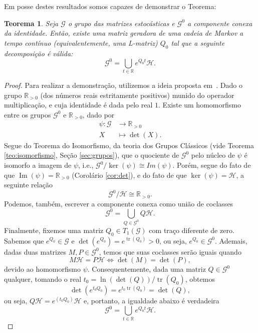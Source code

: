 \documentclass[twoside,openright,titlepage,numbers=noenddot,headinclude,  lineheaders footinclude=true,cleardoublepage=empty,
                                BCOR=5mm,paper=a4,fontsize=12pt ]{scrbook}
\DeclareMathOperator\tr{tr}
\newtheorem{teo}{Teorema}[chapter]
\theoremstyle{definition}
\DeclareMathOperator{\im}{Im}
\begin{document}
%
Em posse destes resultados somos capazes de demonstrar o Teorema:
\begin{teo}
Seja $\mathcal{G}$ o  grupo das matrizes estocásticas e $\mathcal{G}^0$ a componente conexa da identidade.
Então, existe uma matriz geradora de uma cadeia de Markov a tempo contínuo (equivalentemente, uma L-matriz)
 $Q_0$ tal que a seguinte decomposição é válida:
\[
\mathcal{G}^0 = \bigcup_{t \in \mathbb{R}}  e^{Q_0t} \mathcal{H}.
\]
\end{teo}
\begin{proof}
Para realizar a demonstração, utilizemos a ideia proposta em~\cite{paper1}.
Dado o grupo $\mathbb{R}_{> 0}$ (dos números reais estritamente positivos) munido do operador multiplicação, e cuja
 identidade é dada pelo  real $1$.
Existe um homomorfismo entre os grupos $\mathcal{G}^0$ e $\mathbb{R}_{> 0}$, dado por
\begin{align*}
\psi: \mathcal{G} & \rightarrow \mathbb{R}_{> 0}\\
X & \mapsto \det( X ).
\end{align*}
Segue do Teorema do Isomorfismo, da teoria dos Grupos Clássicos (vide Teorema \ref{teo:isomorfismo}, Seção \ref{sec:grupos}),	
que o quociente de $\mathcal{G}^0$ pelo núcleo de $\psi$ é isomorfo a imagem de $\psi$, i.e.,
$\mathcal{G}^0/ \ker(\psi) \cong Im( \psi )$. Porém, segue do fato de
que $\im( \psi ) = \mathbb{R}_{> 0}$ (Corolário \ref{cor:det}), e do fato de que $\ker(\psi) = \mathcal{H}$, a seguinte
relação 
\[
\mathcal{G}^0/ \mathcal{H} \cong \mathbb{R}_{> 0}.
\]
Podemos, também, escrever a componente conexa como união de coclasses
\[
\mathcal{G}^0 = \bigcup_{Q \in \mathcal{G}^0}  Q\mathcal{H}.
\]
Finalmente, fixemos uma matriz $Q_0 \in T_1(\mathcal{G})$ com traço diferente de zero.
Sabemos que $e^{Q_0} \in \mathcal{G}$ e $\det(e^{Q_0}) = e^{\tr(Q_0)} > 0$,
ou seja, $e^{Q_0} \in \mathcal{G}^0$. Ademais, dadas duas matrizes $M, P
\in \mathcal{G}^0$, temos que suas coclasses serão iguais quando
\[
M\mathcal{H} = P \mathcal{H} \iff \det(M) = \det( P),
\]
devido ao homomorfismo $\psi$.
Consequentemente, dada uma matriz $Q \in \mathcal{G}^0$ qualquer, tomando o real 
$t_0 = \ln( \det(Q) ) / \tr( Q_0 )$, obtemos
\[
\det( e^{t_0 Q_0 }) = e^{t_0 \tr( Q_0 )} = \det(Q),
\]
ou seja, $Q\mathcal{H} = e^{(t_0 Q_0)} \mathcal{H}$ e, portanto, a igualdade abaixo
é verdadeira
\[
\mathcal{G}^0 = \bigcup_{t \in \mathbb{R}}  e^{Q_0t} \mathcal{H}.
\]
\end{proof}
\end{document}
